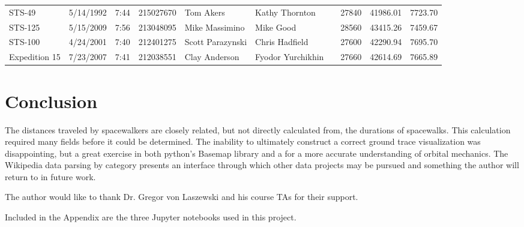 \documentclass[sigconf]{acmart}
\begin{document}
\begin{table}[htb]
{\begin{tabular}{llllllllll}
		STS-49           & 5/14/1992     & 7:44              & 215027670                              & Tom Akers          & Kathy Thornton       &                 & 27840                                 & 41986.01                   & 7723.70                   \\
		STS-125          & 5/15/2009     & 7:56              & 213048095                              & Mike Massimino     & Mike Good            &                 & 28560                                 & 43415.26                   & 7459.67                   \\
		STS-100          & 4/24/2001     & 7:40              & 212401275                              & Scott Parazynski   & Chris Hadfield       &                 & 27600                                 & 42290.94                   & 7695.70                   \\
		Expedition 15    & 7/23/2007     & 7:41              & 212038551                              & Clay Anderson      & Fyodor Yurchikhin    &                 & 27660                                 & 42614.69                   & 7665.89                  
\end{tabular}}
\end{table}

 

\section{Conclusion}
The distances traveled by spacewalkers are closely related, but not directly calculated from, the durations of spacewalks. This calculation required many fields before it could be determined. The inability to ultimately construct a correct ground trace visualization was disappointing, but a great exercise in both python's Basemap library and a for a more accurate understanding of orbital mechanics. The Wikipedia data parsing by category presents an interface through which other data projects may be pursued and something the author will return to in future work. 



\begin{acks}
	
  The author would like to thank Dr. Gregor von Laszewski and his course TAs for their support.
  
\end{acks}


 

\appendix

Included in the Appendix are the three Jupyter notebooks used in this project.


\end{document}
